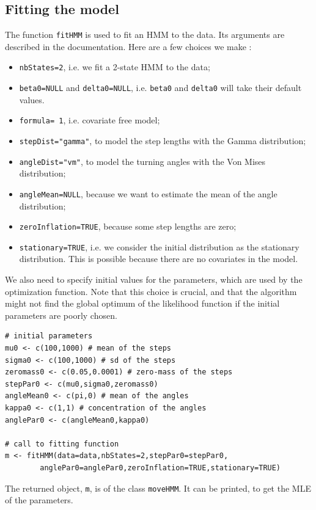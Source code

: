 \documentclass[]{article}
\begin{document}
\subsection{Fitting the model}
The function \texttt{fitHMM} is used to fit an HMM to the data. Its arguments are described in the documentation. Here are a few choices we make :
\begin{itemize}
	\item \texttt{nbStates=2}, i.e. we fit a 2-state HMM to the data;
	\item \texttt{beta0=NULL} and \texttt{delta0=NULL}, i.e. \texttt{beta0} and \texttt{delta0} will take their default values.
	\item \texttt{formula=~1}, i.e. covariate free model;
	\item \texttt{stepDist="gamma"}, to model the step lengths with the Gamma distribution;
	\item \texttt{angleDist="vm"}, to model the turning angles with the Von Mises distribution;
	\item \texttt{angleMean=NULL}, because we want to estimate the mean of the angle distribution;
	\item \texttt{zeroInflation=TRUE}, because some step lengths are zero;
	\item \texttt{stationary=TRUE}, i.e. we consider the initial distribution as the stationary distribution. This is possible because there are no covariates in the model. 
\end{itemize}

We also need to specify initial values for the parameters, which are used by the optimization function. Note that this choice is crucial, and that the algorithm might not find the global optimum of the likelihood function if the initial parameters are poorly chosen.

\begin{lstlisting}
# initial parameters
mu0 <- c(100,1000) # mean of the steps
sigma0 <- c(100,1000) # sd of the steps
zeromass0 <- c(0.05,0.0001) # zero-mass of the steps
stepPar0 <- c(mu0,sigma0,zeromass0)
angleMean0 <- c(pi,0) # mean of the angles
kappa0 <- c(1,1) # concentration of the angles
anglePar0 <- c(angleMean0,kappa0)

# call to fitting function
m <- fitHMM(data=data,nbStates=2,stepPar0=stepPar0,
		anglePar0=anglePar0,zeroInflation=TRUE,stationary=TRUE)
\end{lstlisting}

The returned object, \texttt{m}, is of the class \texttt{moveHMM}. It can be printed, to get the MLE of the parameters.
\end{document}
